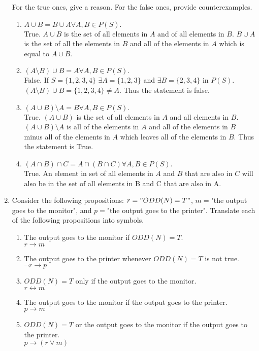 \documentclass{article}
\newcommand{\fivespace}{\space\space\space\space\space}
\begin{document}
\begin{enumerate}
For the true ones, give a reason. For the false ones, provide counterexamples.\\
	\begin{enumerate}
	\item $A\cup B=B\cup A$\fivespace$\forall A,B\in P(S).$\\
	True. $A\cup B$ is the set of all elements in $A$ and of all elements in $B$. $B\cup A$ is the set of
	all the elements in $B$ and all of the elements in $A$ which is equal to $A\cup B$.
	\item $(A\setminus B)\cup B=A$\fivespace$\forall A,B\in P(S).$\\
	False. If $S = \{1,2,3,4\}$ $\exists A=\{1,2,3\}$ and $\exists B=\{2,3,4\}$ in $P(S)$. 
	$(A\setminus B)\cup B=\{1,2,3,4\}\not=A$. Thus the statement is false.
	\item $(A\cup B)\setminus A=B$\fivespace$\forall A,B\in P(S).$\\
	True. $(A\cup B)$ is the set of all elements in $A$ and all elements in $B$. $(A\cup B)\setminus A$ 
	is all of the elements in $A$ and all of the elements in $B$ minus all of the elements in $A$ which leaves 
	all of the elements in $B$. Thus the statement is True.
	\item $(A\cap B)\cap C=A\cap(B\cap C)$\fivespace$\forall A,B\in P(S).$\\
	True. An element in set of all elements in $A$ and $B$ that are also in $C$ will also be in the 
	set of all elements in B and C that are also in A.
	\end{enumerate}
\setcounter{enumi}{15}
\item Consider the following propositions: $r="ODD(N)=T"$, $m=$"the output goes to the monitor", and 
$p=$"the output goes to the printer". Translate each of the following propositions into symbols.
	\begin{enumerate}
	\item The output goes to the monitor if $ODD(N)=T$.\\
	$r\to m$
	\item The output goes to the printer whenever $ODD(N)=T$ is not true.\\
	$\neg r\to p$
	\item $ODD(N)=T$ only if the output goes to the monitor.\\
	$r\leftrightarrow m$
	\item The output goes to the monitor if the output goes to the printer.\\
	$p\to m$
	\item $ODD(N)=T$ or the output goes to the monitor if the output goes to the printer.\\
	$p\to (r\vee m)$
	\end{enumerate}	
\end{enumerate}
\end{document}
